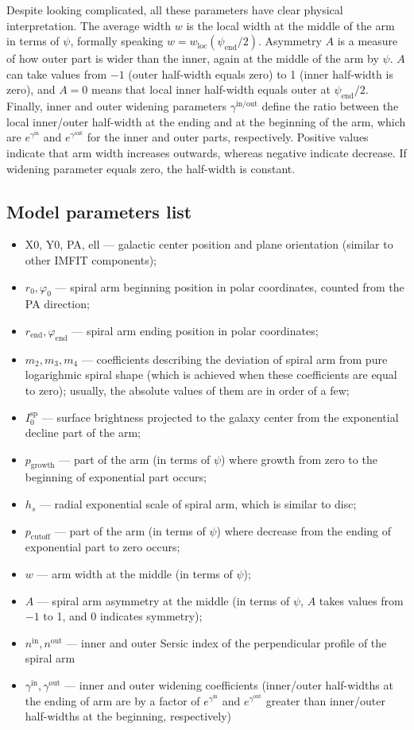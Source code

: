 \documentclass[12pt,a4paper]{article}
\begin{document}
Despite looking complicated, all these parameters have clear physical interpretation. The average width $w$ is the local width at the middle of the arm in terms of $\psi$, formally speaking $w = w_\text{loc}(\psi_\text{end} / 2)$. Asymmetry $A$ is a measure of how outer part is wider than the inner, again at the middle of the arm by $\psi$. $A$ can take values from $-1$ (outer half-width equals zero) to 1 (inner half-width is zero), and $A = 0$ means that local inner half-width equals outer at $\psi_\text{end} / 2$. Finally, inner and outer widening parameters $\gamma^\text{in/out}$ define the ratio between the local inner/outer half-width at the ending and at the beginning of the arm, which are $e^{\gamma^\text{in}}$ and $e^{\gamma^\text{out}}$ for the inner and outer parts, respectively. Positive values indicate that arm width increases outwards, whereas negative indicate decrease. If widening parameter equals zero, the half-width is constant.

\subsection{Model parameters list}
\begin{itemize}
	\item X0, Y0, PA, ell --- galactic center position and plane orientation (similar to other IMFIT components);
	\item $r_0, \varphi_0$ --- spiral arm beginning position in polar coordinates, counted from the PA direction;
	\item $r_\text{end}, \varphi_\text{end}$ --- spiral arm ending position in polar coordinates;
	\item $m_2, m_3, m_4$ --- coefficients describing the deviation of spiral arm from pure logarighmic spiral shape (which is achieved when these coefficients are equal to zero); usually, the absolute values of them are in order of a few;
	\item $I^\text{sp}_0$ --- surface brightness projected to the galaxy center from the exponential decline part of the arm;
	\item $p_\text{growth}$ --- part of the arm (in terms of $\psi$) where growth from zero to the beginning of exponential part occurs;
	\item $h_s$ --- radial exponential scale of spiral arm, which is similar to disc;
	\item $p_\text{cutoff}$ --- part of the arm (in terms of $\psi$) where decrease from the ending of exponential part to zero occurs;
	\item $w$ --- arm width at the middle (in terms of $\psi$);
	\item $A$ --- spiral arm asymmetry at the middle (in terms of $\psi$, $A$ takes values from $-1$ to 1, and 0 indicates symmetry);
	\item $n^\text{in}, n^\text{out}$ --- inner and outer Sersic index of the perpendicular profile of the spiral arm
	\item $\gamma^\text{in}, \gamma^\text{out}$ --- inner and outer widening coefficients (inner/outer half-widths at the ending of arm are by a factor of $e^{\gamma^\text{in}}$ and $e^{\gamma^\text{out}}$ greater than inner/outer half-widths at the beginning, respectively)
\end{itemize}
\end{document}

